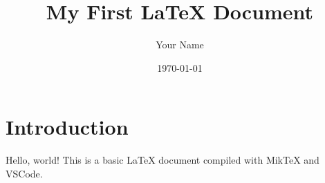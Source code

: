 \documentclass{article}
\title{My First LaTeX Document}
\author{Your Name}
\date{\today}
\begin{document}
\maketitle

\section{Introduction}
Hello, world! This is a basic LaTeX document compiled with MikTeX and VSCode.
\end{document}
